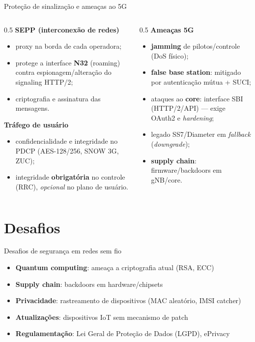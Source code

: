 \documentclass[aspectratio=169,11pt]{beamer}
\begin{document}
\begin{frame}{Proteção de sinalização e ameaças ao 5G}
  \begin{columns}
    \begin{column}{0.5\textwidth}
      \textbf{SEPP (interconexão de redes)}
      \begin{itemize}
        \item proxy na borda de cada operadora;
        \item protege a interface \textbf{N32} (roaming) contra espionagem/alteração do signaling HTTP/2;
        \item criptografia e assinatura das mensagens.
      \end{itemize}
      \textbf{Tráfego de usuário}
      \begin{itemize}
        \item confidencialidade e integridade no PDCP (AES-128/256, SNOW 3G, ZUC);
        \item integridade \textbf{obrigatória} no controle (RRC), \emph{opcional} no plano de usuário.
      \end{itemize}
    \end{column}
    \begin{column}{0.5\textwidth}
      \textbf{Ameaças 5G}
      \begin{itemize}
        \item \textbf{jamming} de pilotos/controle (DoS físico);
        \item \textbf{false base station}: mitigado por autenticação mútua + SUCI;
        \item ataques ao \textbf{core}: interface SBI (HTTP/2/API) --- exige OAuth2 e \emph{hardening};
        \item legado SS7/Diameter em \emph{fallback} (\emph{downgrade});
        \item \textbf{supply chain}: firmware/backdoors em gNB/core.
      \end{itemize}
    \end{column}
  \end{columns}
\end{frame}

\section{Desafios}

\begin{frame}{Desafios de segurança em redes sem fio}
  \begin{itemize}
    \item \textbf{Quantum computing}: ameaça a criptografia atual (RSA, ECC)
    \item \textbf{Supply chain}: backdoors em hardware/chipsets
    \item \textbf{Privacidade}: rastreamento de dispositivos (MAC aleatório, IMSI catcher)
    \item \textbf{Atualizações}: dispositivos IoT sem mecanismo de patch
    \item \textbf{Regulamentação}: Lei Geral de Proteção de Dados (LGPD), ePrivacy
  \end{itemize}
\end{frame}
\end{document}
